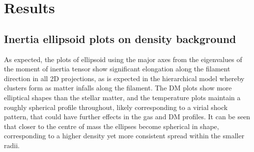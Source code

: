 \documentclass[journal]{IEEEtran}
\begin{document}
\section{Results}

\subsection{Inertia ellipsoid plots on density background}
As expected, the plots of ellipsoid using the major axes from the eigenvalues of the moment of inertia tensor show significant elongation along the filament direction in all 2D projections, as is expected in the hierarchical model whereby clusters form as matter infalls along the filament. The DM plots show more elliptical shapes than the stellar matter, and the temperature plots maintain a roughly spherical profile throughout, likely corresponding to a virial shock pattern, that could have further effects in the gas and DM profiles. It can be seen that closer to the centre of mass the ellipses become spherical in shape, corresponding to a higher density yet more consistent spread within the smaller radii. 
\end{document}
